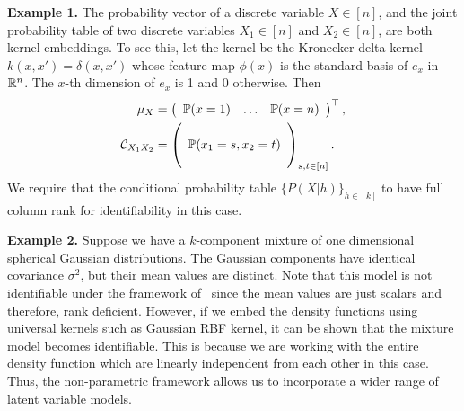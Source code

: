 \documentclass{article}
\begin{document}
{\bf Example 1.} The probability vector of a discrete variable $X \in [n]$, and the joint probability table of two discrete variables $X_1 \in [n]$ and $X_2 \in [n]$, are both kernel embeddings. To see this, let the kernel be the Kronecker delta kernel $k(x,x') = \delta(x,x')$ whose feature map $\phi(x)$ is the standard basis of $e_{x}$ in $\mathbb{R}^n$. The $x$-th dimension of $e_{x}$ is 1 and 0 otherwise. Then
\begin{align}
    \mu_X
		& = \left(
      \begin{array}{ccc}
         \mathbb{P}(x = 1) &
         \hdots &
         \mathbb{P}(x = n)
       \end{array}
    \right)^\top, \nonumber \\
		\mathcal{C}_{X_1X_2}
		&=
		\left(
        \begin{array}{c}
            \cr
            \mathbb{P}(x_1=s,x_2=t) \cr
						\cr
        \end{array}
    \right)_{s,t \in [n]}. \nonumber
\end{align}
We require that the conditional probability table $\{P(X|h)\}_{h\in [k]}$ to  have full column rank for identifiability in this case.


{\bf Example 2.} Suppose we have a $k$-component mixture of one dimensional  spherical Gaussian distributions. The Gaussian components have identical covariance  $\sigma^2$, but their mean values are distinct. Note that this model is not identifiable under the framework of~\cite{Hsu13} since the mean values are just scalars and therefore, rank deficient. However, if we embed the density functions using universal kernels such as Gaussian RBF kernel, it can be shown that the mixture model becomes identifiable. This is because we are working with the entire density function which are linearly independent from each other in this case. Thus, the non-parametric framework allows us to incorporate a wider range of latent variable  models.



%
\end{document}

